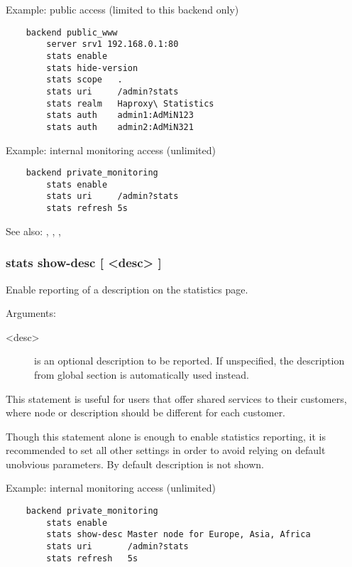   Example: public access (limited to this backend only)
  \begin{verbatim}
    backend public_www
        server srv1 192.168.0.1:80
        stats enable
        stats hide-version
        stats scope   .
        stats uri     /admin?stats
        stats realm   Haproxy\ Statistics
        stats auth    admin1:AdMiN123
        stats auth    admin2:AdMiN321
  \end{verbatim}

  Example: internal monitoring access (unlimited)
  \begin{verbatim}
    backend private_monitoring
        stats enable
        stats uri     /admin?stats
        stats refresh 5s
  \end{verbatim}

  See also: , , , 

\subsubsection[stats show-desc]{stats show-desc [ <desc> ]}


  Enable reporting of a description on the statistics page.


   Arguments:
   \begin{description}
    \item[<desc>]    is an optional description to be reported. If unspecified, the
              description from global section is automatically used instead.
   \end{description}

  This statement is useful for users that offer shared services to their
  customers, where node or description should be different for each customer.

  Though this statement alone is enough to enable statistics reporting, it is
  recommended to set all other settings in order to avoid relying on default
  unobvious parameters.  By default description is not shown.

  Example: internal monitoring access (unlimited)
  \begin{verbatim}
    backend private_monitoring
        stats enable
        stats show-desc Master node for Europe, Asia, Africa
        stats uri       /admin?stats
        stats refresh   5s
  \end{verbatim}

